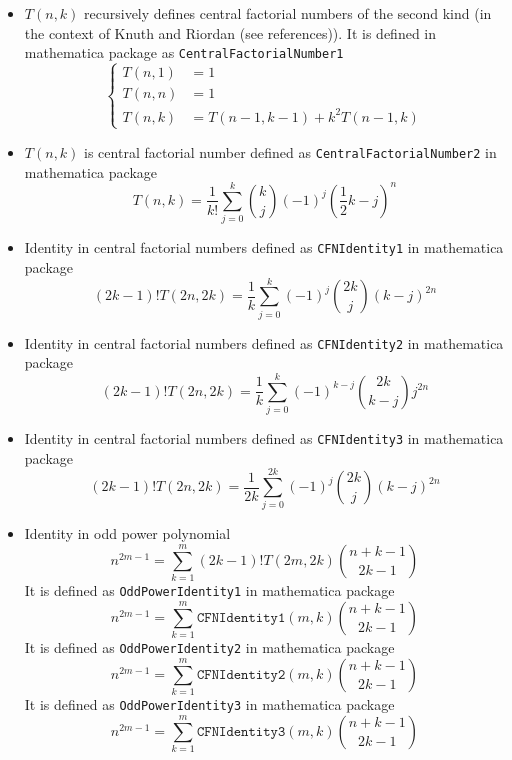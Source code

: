 \begin{itemize}
    \item $T(n,k)$ recursively defines central factorial numbers of the second kind
    (in the context of Knuth and Riordan (see references)).
    It is defined in mathematica package as \texttt{CentralFactorialNumber1}
    \begin{equation*}
        \begin{cases}
            T(n,1) &= 1 \\
            T(n,n) &= 1 \\
            T(n,k) &= T(n-1, k-1) + k^2 T(n-1, k)
        \end{cases}
    \end{equation*}
    \item $T(n,k)$ is central factorial number defined as \texttt{CentralFactorialNumber2} in mathematica package
    \begin{equation*}
        T(n,k) = \frac{1}{k!} \sum_{j=0}^{k} \binom{k}{j} (-1)^{j} \left( \frac{1}{2}k - j \right)^{n}
    \end{equation*}
    \item Identity in central factorial numbers defined as \texttt{CFNIdentity1} in mathematica package
    \begin{equation*}
    (2k-1)! T(2n,2k) = \frac{1}{k} \sum_{j=0}^{k} (-1)^j \binom{2k}{j} (k-j)^{2n}
    \end{equation*}
    \item Identity in central factorial numbers defined as \texttt{CFNIdentity2} in mathematica package
    \begin{equation*}
    (2k-1)! T(2n,2k) = \frac{1}{k} \sum_{j=0}^{k} (-1)^{k-j} \binom{2k}{k-j} j^{2n}
    \end{equation*}
    \item Identity in central factorial numbers defined as \texttt{CFNIdentity3} in mathematica package
    \begin{equation*}
    (2k-1)! T(2n, 2k) = \frac{1}{2k} \sum_{j=0}^{2k} (-1)^{j} \binom{2k}{j} (k-j)^{2n}
    \end{equation*}
    \item Identity in odd power polynomial
    \begin{equation*}
        n^{2m-1} = \sum_{k=1}^{m} (2k-1)! T(2m,2k) \binom{n+k-1}{2k-1}
    \end{equation*}
    It is defined as \texttt{OddPowerIdentity1} in mathematica package
    \begin{equation*}
        n^{2m-1} = \sum_{k=1}^{m} \mathtt{CFNIdentity1} (m,k) \binom{n+k-1}{2k-1}
    \end{equation*}
    It is defined as \texttt{OddPowerIdentity2} in mathematica package
    \begin{equation*}
        n^{2m-1} = \sum_{k=1}^{m} \mathtt{CFNIdentity2} (m,k) \binom{n+k-1}{2k-1}
    \end{equation*}
    It is defined as \texttt{OddPowerIdentity3} in mathematica package
    \begin{equation*}
        n^{2m-1} = \sum_{k=1}^{m} \mathtt{CFNIdentity3} (m,k) \binom{n+k-1}{2k-1}
    \end{equation*}
\end{itemize}